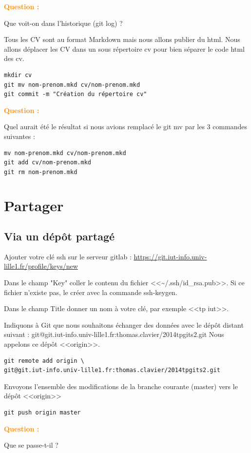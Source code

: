 \documentclass[a4paper]{article}
\newcounter{question}
\newcommand{\q}{
  \textcolor{DarkOrange}{\textbf{Question \thequestion : }}
  \addtocounter{question}{1}
  \newline
}
\begin{document}
\q Que voit-on dans l'historique (git log) ?

Tous les CV sont au format Markdown mais nous allons publier du html.
Nous allons déplacer les CV dans un sous répertoire cv pour bien séparer le code html des cv.

\begin{verbatim}
mkdir cv
git mv nom-prenom.mkd cv/nom-prenom.mkd
git commit -m "Création du répertoire cv"
\end{verbatim}

\q Quel aurait été le résultat si nous avions remplacé le git mv par les 3 commandes suivantes :
\begin{verbatim}
mv nom-prenom.mkd cv/nom-prenom.mkd
git add cv/nom-prenom.mkd
git rm nom-prenom.mkd
\end{verbatim}

\section*{Partager}

\subsection*{Via un dépôt partagé}

Ajouter votre clé ssh sur le serveur gitlab : 
\url{https://git.iut-info.univ-lille1.fr/profile/keys/new}


Dans le champ "Key" coller le contenu du fichier <<\textasciitilde/.ssh/id\_rsa.pub>>.
Si ce fichier n'existe pas, le créer avec la commande ssh-keygen.

Dans le champ Title donner un nom à votre clé, par exemple <<tp iut>>.

Indiquons à Git que nous souhaitons échanger des données avec le dépôt distant suivant : git@git.iut-info.univ-lille1.fr:thomas.clavier/2014tpgits2.git
Nous appelons ce dépôt <<origin>>.

\begin{verbatim}
git remote add origin \
git@git.iut-info.univ-lille1.fr:thomas.clavier/2014tpgits2.git
\end{verbatim}

Envoyons l'ensemble des modifications de la branche courante (master) vers le dépôt <<origin>>

\begin{verbatim}
git push origin master
\end{verbatim}

\q Que se passe-t-il ?
\end{document}

